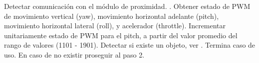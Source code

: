 \begin{UCtrayectoria}
	\UCpaso [\UCactor] Detectar comunicación con el módulo de proximidad. 
		.
	\UCpaso Obtener estado de PWM de movimiento vertical (yaw), movimiento 
	horizontal adelante (pitch), movimiento horizontal lateral (roll), 
	y acelerador (throttle).
	\UCpaso Incrementar unitariamente estado de PWM para el pitch, a partir 
	del valor promedio del rango de valores (1101 - 1901).
	\UCpaso Detectar si existe un objeto, ver . Termina 
	caso de uso. En caso de no existir proseguir al paso 2.
\end{UCtrayectoria}








